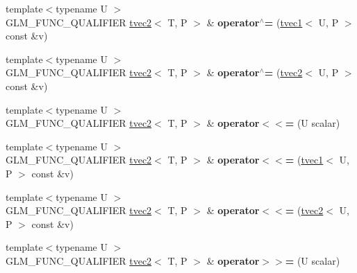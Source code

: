 \begin{DoxyCompactItemize}
{\footnotesize template$<$typename U $>$ }\\G\+L\+M\+\_\+\+F\+U\+N\+C\+\_\+\+Q\+U\+A\+L\+I\+F\+I\+ER \hyperlink{structglm_1_1tvec2}{tvec2}$<$ T, P $>$ \& {\bfseries operator$^\wedge$=} (\hyperlink{structglm_1_1tvec1}{tvec1}$<$ U, P $>$ const \&v)
\item 
\mbox{\label{structglm_1_1tvec2_a97ae34925859e7738cf400ecc4880190}} 
{\footnotesize template$<$typename U $>$ }\\G\+L\+M\+\_\+\+F\+U\+N\+C\+\_\+\+Q\+U\+A\+L\+I\+F\+I\+ER \hyperlink{structglm_1_1tvec2}{tvec2}$<$ T, P $>$ \& {\bfseries operator$^\wedge$=} (\hyperlink{structglm_1_1tvec2}{tvec2}$<$ U, P $>$ const \&v)
\item 
\mbox{\label{structglm_1_1tvec2_a6afc7e45c6438990e7cd48b03369e79c}} 
{\footnotesize template$<$typename U $>$ }\\G\+L\+M\+\_\+\+F\+U\+N\+C\+\_\+\+Q\+U\+A\+L\+I\+F\+I\+ER \hyperlink{structglm_1_1tvec2}{tvec2}$<$ T, P $>$ \& {\bfseries operator$<$$<$=} (U scalar)
\item 
\mbox{\label{structglm_1_1tvec2_a4ee968bac5e887631cb05668dd34da58}} 
{\footnotesize template$<$typename U $>$ }\\G\+L\+M\+\_\+\+F\+U\+N\+C\+\_\+\+Q\+U\+A\+L\+I\+F\+I\+ER \hyperlink{structglm_1_1tvec2}{tvec2}$<$ T, P $>$ \& {\bfseries operator$<$$<$=} (\hyperlink{structglm_1_1tvec1}{tvec1}$<$ U, P $>$ const \&v)
\item 
\mbox{\label{structglm_1_1tvec2_adc5cbebcee78fbff8fee4978e4dd8c87}} 
{\footnotesize template$<$typename U $>$ }\\G\+L\+M\+\_\+\+F\+U\+N\+C\+\_\+\+Q\+U\+A\+L\+I\+F\+I\+ER \hyperlink{structglm_1_1tvec2}{tvec2}$<$ T, P $>$ \& {\bfseries operator$<$$<$=} (\hyperlink{structglm_1_1tvec2}{tvec2}$<$ U, P $>$ const \&v)
\item 
\mbox{\label{structglm_1_1tvec2_ab3fb4bc1c2f4341932885837bb7e48d9}} 
{\footnotesize template$<$typename U $>$ }\\G\+L\+M\+\_\+\+F\+U\+N\+C\+\_\+\+Q\+U\+A\+L\+I\+F\+I\+ER \hyperlink{structglm_1_1tvec2}{tvec2}$<$ T, P $>$ \& {\bfseries operator$>$$>$=} (U scalar)
\item 
\mbox{\label{structglm_1_1tvec2_a7c5bc1c8d4d3f176b17cbc50ed99d953}} 

\end{DoxyCompactItemize}
